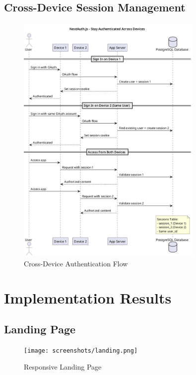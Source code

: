 \subsection{Cross-Device Session Management}
\begin{figure}[H]
    \centering
    \includegraphics[width=0.8\textwidth]{conception/SprintII/sequence_diagrams/sequence_authentication_1_3_StayAuthenticatedAcrossDevices.png}
    \caption{Cross-Device Authentication Flow}
    \label{fig:seq_cross_device}
\end{figure}

\section{Implementation Results}

\subsection{Landing Page}
\begin{figure}[H]
    \centering
    \texttt{[image: screenshots/landing.png]}
    \caption{Responsive Landing Page}
    \label{fig:landing_page}
\end{figure}

